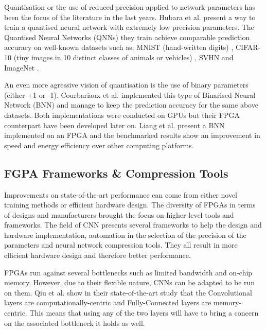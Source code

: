 Quantisation or the use of reduced precision applied to network parameters has been the focus of the literature in the last years. Hubara et al. \cite{Hubara2016} present a way to train a quantised neural network with extremely low precision parameters. The Quantised Neural Networks (QNNs) they train achieve comparable prediction accuracy on well-known datasets such as: MNIST (hand-written digits) \cite{Lecun2010}, CIFAR-10 (tiny images in 10 distinct classes of animals or vehicles) \cite{Krizhevsky2012}, SVHN \cite{Netzer2011} and ImageNet \cite{ImageNet2009}.

An even more agressive vision of quantisation is the use of binary parameters (either +1 or -1). Courbariaux et al. \cite{Courbariaux2016} implemented this type of Binarised Neural Network (BNN) and manage to keep the prediction accuracy for the same above datasets. Both implementations were conducted on GPUs but their FPGA counterpart have been developed later on. Liang et al. \cite{Liang2017} present a BNN implemented on an FPGA and the benchmarked results show an improvement in speed and energy efficiency over other computing platforms.

\subsection{FGPA Frameworks \& Compression Tools}
Improvements on state-of-the-art performance can come from either novel training methods or efficient hardware design. The diversity of FPGAs in terms of designs and manufacturers brought the focus on higher-level tools and frameworks. The field of CNN presents several frameworks to help the design and hardware implementation, automation in the selection of the precision of the parameters and neural network compression tools. They all result in more efficient hardware design and therefore better performance.

FPGAs run against several bottlenecks such as limited bandwidth and on-chip memory. However, due to their flexible nature, CNNs can be adapted to be run on them. Qiu et al. \cite{Qiu2016} show in their state-of-the-art study that the Convolutional layers are computationally-centric and Fully-Connected layers are memory-centric. This means that using any of the two layers will have to bring a concern on the associated bottleneck it holds as well.

